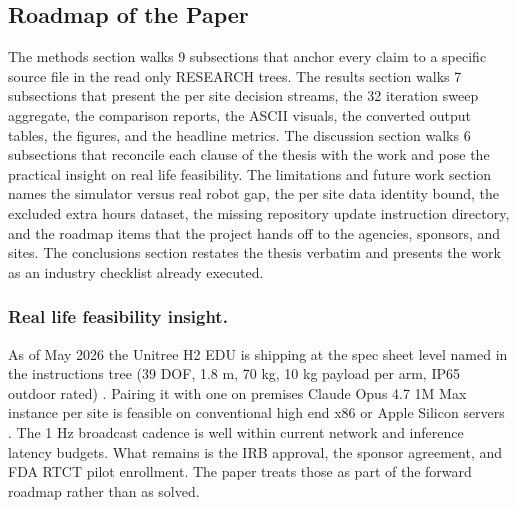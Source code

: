 \begin{sectionaccent}
\subsection{Roadmap of the Paper}
\label{sec:intro-roadmap}

The methods section walks 9 subsections that anchor every claim to a
specific source file in the read only RESEARCH trees. The results
section walks 7 subsections that present the per site decision
streams, the 32 iteration sweep aggregate, the comparison reports,
the ASCII visuals, the converted output tables, the figures, and the
headline metrics. The discussion section walks 6 subsections that
reconcile each clause of the thesis with the work and pose the
practical insight on real life feasibility. The limitations and future
work section names the simulator versus real robot gap, the per site
data identity bound, the excluded extra hours dataset, the missing
repository update instruction directory, and the roadmap items that
the project hands off to the agencies, sponsors, and sites. The
conclusions section restates the thesis verbatim and presents the
work as an industry checklist already executed.

\subsubsection*{Real life feasibility insight.} As of May 2026 the
Unitree H2 EDU is shipping at the spec sheet level named in the
instructions tree (39 DOF, 1.8 m, 70 kg, 10 kg payload per arm, IP65
outdoor rated) \cite{unitree_h2_2026}. Pairing it with one on
premises Claude Opus 4.7 1M Max instance per site is feasible on
conventional high end x86 or Apple Silicon servers
\cite{anthropic_claude_opus_47_2026}. The 1 Hz broadcast cadence is
well within current network and inference latency budgets. What
remains is the IRB approval, the sponsor agreement, and FDA RTCT
pilot enrollment. The paper treats those as part of the forward
roadmap rather than as solved.


\end{sectionaccent}
